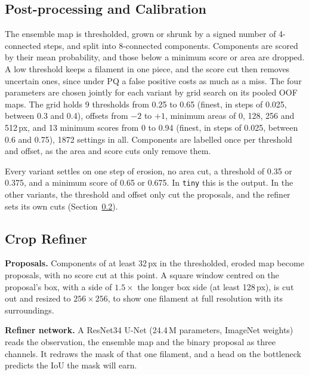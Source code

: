 \documentclass[sigconf,pbalance]{acmart}
\begin{document}
    \subsection{Post-processing and Calibration}\label{subsec:calibration}
    The ensemble map is thresholded, grown or shrunk by a signed number of 4-connected steps, and split into 8-connected components.
    Components are scored by their mean probability, and those below a minimum score or area are dropped.
    A low threshold keeps a filament in one piece, and the score cut then removes uncertain ones, since under PQ a false positive costs as much as a miss.
    The four parameters are chosen jointly for each variant by grid search on its pooled OOF maps.
    The grid holds 9 thresholds from 0.25 to 0.65 (finest, in steps of 0.025, between 0.3 and 0.4), offsets from $-2$ to $+1$, minimum areas of 0, 128, 256 and 512\,px, and 13 minimum scores from 0 to 0.94 (finest, in steps of 0.025, between 0.6 and 0.75), 1872 settings in all.
    Components are labelled once per threshold and offset, as the area and score cuts only remove them.

    Every variant settles on one step of erosion, no area cut, a threshold of 0.35 or 0.375, and a minimum score of 0.65 or 0.675.
    In \texttt{tiny} this is the output.
    In the other variants, the threshold and offset only cut the proposals, and the refiner sets its own cuts (Section~\ref{subsec:refiner}).

    \subsection{Crop Refiner}\label{subsec:refiner}
    \textbf{Proposals.}
    Components of at least 32\,px in the thresholded, eroded map become proposals, with no score cut at this point.
    A square window centred on the proposal's box, with a side of $1.5\times$ the longer box side (at least 128\,px), is cut out and resized to $256\times256$, to show one filament at full resolution with its surroundings.

    \textbf{Refiner network.}
    A ResNet34 U-Net (24.4\,M parameters, ImageNet weights) reads the observation, the ensemble map and the binary proposal as three channels.
    It redraws the mask of that one filament, and a head on the bottleneck predicts the IoU the mask will earn.
\end{document}
